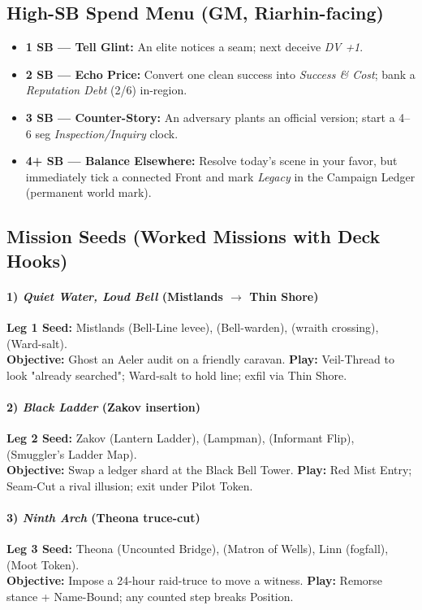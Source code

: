 \subsection{High-SB Spend Menu (GM, Riarhin-facing)}
\begin{itemize}
  \item \textbf{1 SB — Tell Glint:} An elite notices a seam; next deceive \emph{DV +1}.
  \item \textbf{2 SB — Echo Price:} Convert one clean success into \emph{Success \& Cost}; bank a \emph{Reputation Debt} (2/6) in-region.
  \item \textbf{3 SB — Counter-Story:} An adversary plants an official version; start a 4–6 seg \emph{Inspection/Inquiry} clock.
  \item \textbf{4+ SB — Balance Elsewhere:} Resolve today's scene in your favor, but immediately tick a connected Front and mark \emph{Legacy} in the Campaign Ledger (permanent world mark).
\end{itemize}

\subsection{Mission Seeds (Worked Missions with Deck Hooks)}
\paragraph{1) \emph{Quiet Water, Loud Bell} (Mistlands $\to$ Thin Shore)}
\textbf{Leg 1 Seed:} Mistlands \SuitSpade{} (Bell-Line levee), \SuitHeart{} (Bell-warden), \SuitClub{} (wraith crossing), \SuitDiamond{} (Ward-salt). \\
\textbf{Objective:} Ghost an Aeler audit on a friendly caravan. \textbf{Play:} Veil-Thread to look "already searched"; Ward-salt to hold line; exfil via Thin Shore.

\paragraph{2) \emph{Black Ladder} (Zakov insertion)}
\textbf{Leg 2 Seed:} Zakov \SuitSpade{} (Lantern Ladder), \SuitHeart{} (Lampman), \SuitClub{} (Informant Flip), \SuitDiamond{} (Smuggler's Ladder Map). \\
\textbf{Objective:} Swap a ledger shard at the Black Bell Tower. \textbf{Play:} Red Mist Entry; Seam-Cut a rival illusion; exit under Pilot Token.

\paragraph{3) \emph{Ninth Arch} (Theona truce-cut)}
\textbf{Leg 3 Seed:} Theona \SuitSpade{} (Uncounted Bridge), \SuitHeart{} (Matron of Wells), Linn \SuitClub{} (fogfall), \SuitDiamond{} (Moot Token). \\
\textbf{Objective:} Impose a 24-hour raid-truce to move a witness. \textbf{Play:} Remorse stance + Name-Bound; any counted step breaks Position.

